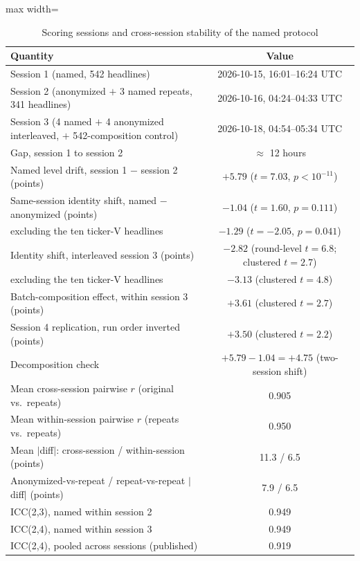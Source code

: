 \begin{table}[htbp]
\centering
\small
\caption{Scoring sessions and cross-session stability of the named protocol}
\label{tab:session}
\begin{adjustbox}{max width=\textwidth}
\begin{tabular}{lc}
\toprule
Quantity & Value \\
\midrule
Session 1 (named, 542 headlines) & 2026-10-15, 16:01--16:24 UTC \\
Session 2 (anonymized $+$ 3 named repeats, 341 headlines) & 2026-10-16, 04:24--04:33 UTC \\
Session 3 (4 named $+$ 4 anonymized interleaved, $+$ 542-composition control) & 2026-10-18, 04:54--05:34 UTC \\
Gap, session 1 to session 2 & $\approx$ 12 hours \\
\midrule
Named level drift, session 1 $-$ session 2 (points) & $+5.79$ ($t=7.03$, $p<10^{-11}$) \\
Same-session identity shift, named $-$ anonymized (points) & $-1.04$ ($t=1.60$, $p=0.111$) \\
\quad excluding the ten ticker-V headlines & $-1.29$ ($t=-2.05$, $p=0.041$) \\
Identity shift, interleaved session 3 (points) & $-2.82$ (round-level $t=6.8$; clustered $t=2.7$) \\
\quad excluding the ten ticker-V headlines & $-3.13$ (clustered $t=4.8$) \\
Batch-composition effect, within session 3 (points) & $+3.61$ (clustered $t=2.7$) \\
Session 4 replication, run order inverted (points) & $+3.50$ (clustered $t=2.2$) \\
Decomposition check & $+5.79-1.04=+4.75$ (two-session shift) \\
\midrule
Mean cross-session pairwise $r$ (original vs.\ repeats) & 0.905 \\
Mean within-session pairwise $r$ (repeats vs.\ repeats) & 0.950 \\
Mean $|$diff$|$: cross-session / within-session (points) & 11.3 / 6.5 \\
Anonymized-vs-repeat / repeat-vs-repeat $|$diff$|$ (points) & 7.9 / 6.5 \\
ICC(2,3), named within session 2 & 0.949 \\
ICC(2,4), named within session 3 & 0.949 \\
ICC(2,4), pooled across sessions (published) & 0.919 \\
\bottomrule

\end{tabular}
\end{adjustbox}
\end{table}
